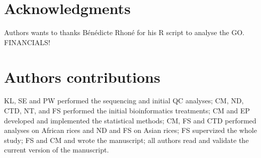 \documentclass[10pt,letterpaper]{article}
\begin{document}
% 

\section*{Acknowledgments}
Authors wants to thanks Bénédicte Rhoné for his R script to analyse the GO.
FINANCIALS!


\section*{Authors contributions}
KL, SE and PW performed the sequencing and initial QC analyses; CM, ND, CTD, NT, and FS performed the initial bioinformatics treatments; CM and EP developed and implemented the statistical methods; CM, FS and CTD performed analyses on African rices and ND and FS on Asian rices; FS supervized the whole study; FS and CM and wrote the manuscript; all authors read and validate the current version of the manuscript.


\nolinenumbers
\end{document}

